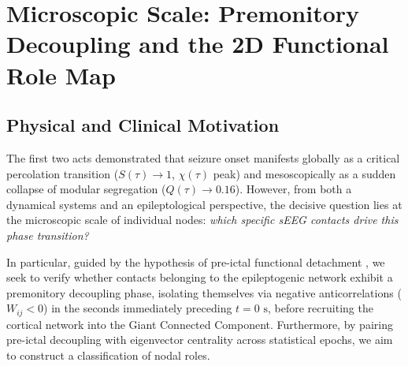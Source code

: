 \section[Microscopic Scale: Decoupling and Functional Roles]{Microscopic Scale: Premonitory Decoupling and the 2D Functional Role Map}
\label{sec:act3_micro}

\subsection{Physical and Clinical Motivation}
The first two acts demonstrated that seizure onset manifests globally as a critical percolation transition ($S(\tau) \to 1$, $\chi(\tau)$ peak) and mesoscopically as a sudden collapse of modular segregation ($Q(\tau) \to 0.16$). However, from both a dynamical systems and an epileptological perspective, the decisive question lies at the microscopic scale of individual nodes: \textit{which specific sEEG contacts drive this phase transition?}

In particular, guided by the hypothesis of pre-ictal functional detachment \cite{jiruska2013synchronization, mormann2003epileptic}, we seek to verify whether contacts belonging to the epileptogenic network exhibit a premonitory decoupling phase, isolating themselves via negative anticorrelations ($W_{ij} < 0$) in the seconds immediately preceding $t = 0\text{ s}$, before recruiting the cortical network into the Giant Connected Component. Furthermore, by pairing pre-ictal decoupling with eigenvector centrality across statistical epochs, we aim to construct a classification of nodal roles.

